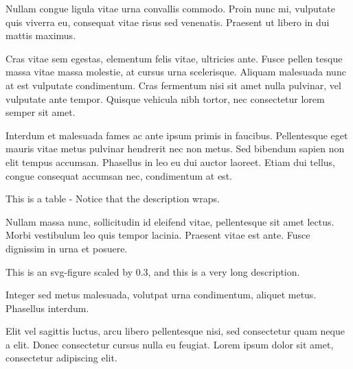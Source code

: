 \documentclass{textbook}
\begin{document}

Nullam congue ligula vitae urna convallis commodo. Proin nunc mi, vulputate quis viverra eu, consequat vitae risus sed venenatis. Praesent ut libero in dui mattis maximus.


Cras vitae sem egestas, elementum felis vitae, ultricies ante. Fusce pellen tesque massa vitae massa molestie, at cursus urna scelerisque. Aliquam malesuada nunc at est vulputate condimentum. Cras fermentum nisi sit amet nulla pulvinar, vel vulputate ante tempor. Quisque vehicula nibh tortor, nec consectetur lorem semper sit amet.

Interdum et malesuada fames ac ante ipsum primis in faucibus. Pellentesque eget mauris vitae metus pulvinar hendrerit nec non metus. Sed bibendum sapien non elit tempus accumsan. Phasellus in leo eu dui auctor laoreet. Etiam dui tellus, congue consequat accumsan nec, condimentum at est.

    {This is a table - Notice that the description wraps.}

Nullam massa nunc, sollicitudin id eleifend vitae, pellentesque sit amet lectus. Morbi vestibulum leo quis tempor lacinia. Praesent vitae est ante. Fusce dignissim in urna et posuere.

    {This is an svg-figure scaled by 0.3, and this is a very long description.}

Integer sed metus malesuada, volutpat urna condimentum, aliquet metus. Phasellus interdum.

Elit vel sagittis luctus, arcu libero pellentesque nisi, sed consectetur quam neque a elit. Donec consectetur cursus nulla eu feugiat. Lorem ipsum dolor sit amet, consectetur adipiscing elit.

\end{document}

